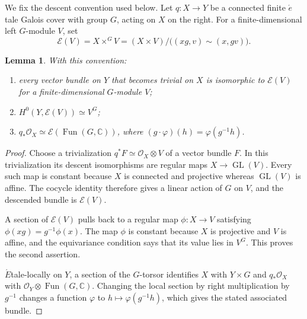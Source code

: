 \documentclass[a4paper]{amsart}
\newtheorem{lemma}[theorem]{Lemma}
\theoremstyle{remark}
\DeclareMathOperator{\Fun}{Fun}
\newcommand{\OO}{\mathcal O}
\newcommand{\CC}{\mathbb C}
\begin{document}
We fix the descent convention used below.  Let \(q:X\to Y\) be a connected finite \(\acute{e}\)tale Galois cover with group \(G\), acting on \(X\) on the right.  For a finite-dimensional left \(G\)-module \(V\), set
\[
 \mathcal E(V)=X\times^G V
 =(X\times V)/\bigl((xg,v)\sim(x,gv)\bigr).
\]

\begin{lemma}\label{lem:descent}
With this convention:
\begin{enumerate}
\item every vector bundle on \(Y\) that becomes trivial on \(X\) is isomorphic to \(\mathcal E(V)\) for a finite-dimensional \(G\)-module \(V\);
\item \(H^0(Y,\mathcal E(V))\simeq V^G\);
\item \(q_*\OO_X\simeq\mathcal E(\Fun(G,\CC))\), where
\((g\cdot\varphi)(h)=\varphi(g^{-1}h)\).
\end{enumerate}
\end{lemma}

\begin{proof}
Choose a trivialization \(q^*F\simeq\OO_X\otimes V\) of a vector bundle \(F\).  In this trivialization its descent isomorphisms are regular maps
\(X\to\operatorname{GL}(V)\).  Every such map is constant because \(X\) is connected and projective whereas \(\operatorname{GL}(V)\) is affine.  The cocycle identity therefore gives a linear action of \(G\) on \(V\), and the descended bundle is \(\mathcal E(V)\).

A section of \(\mathcal E(V)\) pulls back to a regular map
\(\phi:X\to V\) satisfying \(\phi(xg)=g^{-1}\phi(x)\).  The map \(\phi\) is constant because \(X\) is projective and \(V\) is affine, and the equivariance condition says that its value lies in \(V^G\).  This proves the second assertion.

\(\acute{E}\)tale-locally on \(Y\), a section of the \(G\)-torsor identifies \(X\) with \(Y\times G\) and \(q_*\OO_X\) with \(\OO_Y\otimes\Fun(G,\CC)\).  Changing the local section by right multiplication by \(g^{-1}\) changes a function \(\varphi\) to \(h\mapsto\varphi(g^{-1}h)\), which gives the stated associated bundle.
\end{proof}
\end{document}
